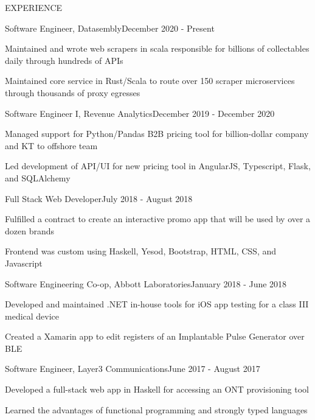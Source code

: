 \documentclass{resume} %
\begin{document}
\begin{rSection}{EXPERIENCE}

  \begin{rSubsection}{Software Engineer, Datasembly}{December 2020 - Present}{}{}
  \item Maintained and wrote web scrapers in scala responsible for billions of collectables daily through hundreds of APIs
  \item Maintained core service in Rust/Scala to route over 150 scraper microservices through thousands of proxy egresses
  \end{rSubsection} 


  \begin{rSubsection}{Software Engineer I, Revenue Analytics}{December 2019 - December 2020}{}{}
  \item Managed support for Python/Pandas B2B pricing tool for billion-dollar company and KT to offshore team
  \item Led development of API/UI for new pricing tool in AngularJS, Typescript, Flask, and SQLAlchemy
  \end{rSubsection} 


  \begin{rSubsection}{Full Stack Web Developer}{July 2018 - August 2018}{}{}
  \item Fulfilled a contract to create an interactive promo app that will be used by over a dozen brands
  \item Frontend was custom using Haskell, Yesod, Bootstrap, HTML, CSS, and Javascript
  \end{rSubsection} 


  \begin{rSubsection}{Software Engineering Co-op, Abbott Laboratories}{January 2018 - June 2018}{}{}
  \item Developed and maintained .NET in-house tools for iOS app testing for a class III medical device
  \item Created a Xamarin app to edit registers of an Implantable Pulse Generator over BLE
  \end{rSubsection} 


  \begin{rSubsection}{Software Engineer, Layer3 Communications}{June 2017 - August 2017}{}{}
  \item Developed a full-stack web app in Haskell for accessing an ONT provisioning tool
  \item Learned the advantages of functional programming and strongly typed languages
  \end{rSubsection} 


\end{rSection}
\end{document}
